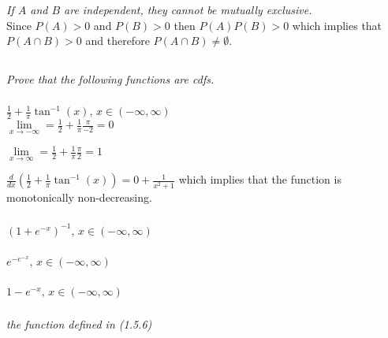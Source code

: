 \documentclass[12pt]{amsart}
\begin{document}
	\subsubsection{} \textit{If \(A\) and \(B\) are independent, they cannot be mutually exclusive.} \\
	
	Since \(P(A) > 0\) and \(P(B) > 0\) then \(P(A)P(B) > 0\) which implies that \(P(A\cap B)>0\)
	and therefore \(P(A\cap B)\neq\emptyset\). \\
	

\setcounter{subsection}{46}
\subsection{} %
\textit{Prove that the following functions are cdfs.}
	\subsubsection{} \( \frac{1}{2}+\frac{1}{\pi} \tan^{-1}(x),\, x\in(-\infty,\infty) \) \\
	
		$\lim\limits_{x\rightarrow-\infty} = \frac{1}{2}+\frac{1}{\pi}\frac{\pi}{-2} = 0$
		
		$\lim\limits_{x\rightarrow\infty} = \frac{1}{2}+\frac{1}{\pi}\frac{\pi}{2} = 1$
		
		$ \frac{d}{dx}\left(\frac{1}{2}+\frac{1}{\pi} \tan^{-1}(x)\right) = 0 + \frac{1}{x^2+1} $ which implies that the function is monotonically non-decreasing. \\
	
	\subsubsection{} \( (1+e^{-x})^{-1},\, x\in(-\infty,\infty) \) \\
	\subsubsection{} \( e^{-e^{-x}},\, x\in(-\infty,\infty) \) \\
	\subsubsection{} \( 1-e^{-x},\, x\in(-\infty,\infty) \) \\
	\subsubsection{} \textit{the function defined in (1.5.6)} \\
\end{document}
